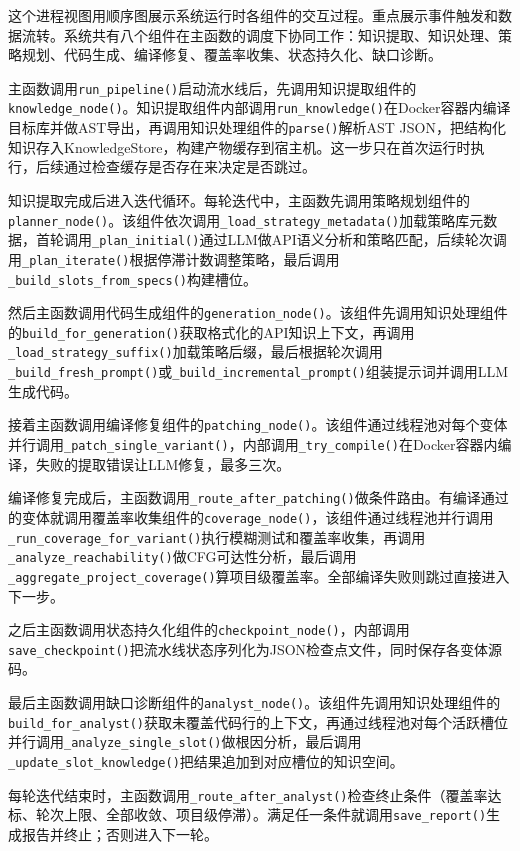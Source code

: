 这个进程视图用顺序图展示系统运行时各组件的交互过程。重点展示事件触发和数据流转。系统共有八个组件在主函数的调度下协同工作：知识提取、知识处理、策略规划、代码生成、编译修复、覆盖率收集、状态持久化、缺口诊断。

主函数调用\texttt{run\_pipeline()}启动流水线后，先调用知识提取组件的\texttt{knowledge\_node()}。知识提取组件内部调用\texttt{run\_knowledge()}在Docker容器内编译目标库并做AST导出，再调用知识处理组件的\texttt{parse()}解析AST JSON，把结构化知识存入KnowledgeStore，构建产物缓存到宿主机。这一步只在首次运行时执行，后续通过检查缓存是否存在来决定是否跳过。

知识提取完成后进入迭代循环。每轮迭代中，主函数先调用策略规划组件的\texttt{planner\_node()}。该组件依次调用\texttt{\_load\_strategy\_metadata()}加载策略库元数据，首轮调用\texttt{\_plan\_initial()}通过LLM做API语义分析和策略匹配，后续轮次调用\texttt{\_plan\_iterate()}根据停滞计数调整策略，最后调用\texttt{\_build\_slots\_from\_specs()}构建槽位。

然后主函数调用代码生成组件的\texttt{generation\_node()}。该组件先调用知识处理组件的\texttt{build\_for\_generation()}获取格式化的API知识上下文，再调用\texttt{\_load\_strategy\_suffix()}加载策略后缀，最后根据轮次调用\texttt{\_build\_fresh\_prompt()}或\texttt{\_build\_incremental\_prompt()}组装提示词并调用LLM生成代码。

接着主函数调用编译修复组件的\texttt{patching\_node()}。该组件通过线程池对每个变体并行调用\texttt{\_patch\_single\_variant()}，内部调用\texttt{\_try\_compile()}在Docker容器内编译，失败的提取错误让LLM修复，最多三次。

编译修复完成后，主函数调用\texttt{\_route\_after\_patching()}做条件路由。有编译通过的变体就调用覆盖率收集组件的\texttt{coverage\_node()}，该组件通过线程池并行调用\texttt{\_run\_coverage\_for\_variant()}执行模糊测试和覆盖率收集，再调用\texttt{\_analyze\_reachability()}做CFG可达性分析，最后调用\texttt{\_aggregate\_project\_coverage()}算项目级覆盖率。全部编译失败则跳过直接进入下一步。

之后主函数调用状态持久化组件的\texttt{checkpoint\_node()}，内部调用\texttt{save\_checkpoint()}把流水线状态序列化为JSON检查点文件，同时保存各变体源码。

最后主函数调用缺口诊断组件的\texttt{analyst\_node()}。该组件先调用知识处理组件的\texttt{build\_for\_analyst()}获取未覆盖代码行的上下文，再通过线程池对每个活跃槽位并行调用\texttt{\_analyze\_single\_slot()}做根因分析，最后调用\texttt{\_update\_slot\_knowledge()}把结果追加到对应槽位的知识空间。

每轮迭代结束时，主函数调用\texttt{\_route\_after\_analyst()}检查终止条件（覆盖率达标、轮次上限、全部收敛、项目级停滞）。满足任一条件就调用\texttt{save\_report()}生成报告并终止；否则进入下一轮。

